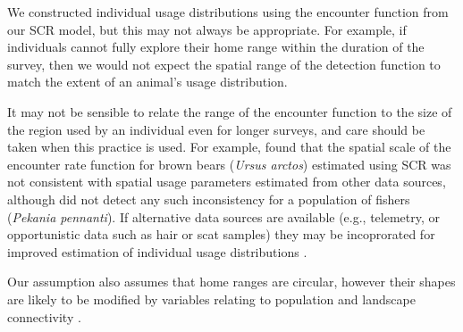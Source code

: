 \documentclass[10pt,a4paper]{article}\usepackage[]{graphicx}\usepackage[]{color}
\begin{document}

We constructed individual usage distributions using the encounter
function from our SCR model, but this may not always be
appropriate. For example, if individuals cannot fully explore their
home range within the duration of the survey, then we would not expect
the spatial range of the detection function to match the extent of an
animal's usage distribution.

It may not be sensible to relate the range of the encounter function
to the size of the region used by an individual even for longer
surveys, and care should be taken when this practice is used. For
example, \citet{Tenan+al:17} found that the spatial scale of the
encounter rate function for brown bears (\emph{Ursus arctos})
estimated using SCR was not consistent with spatial usage parameters
estimated from other data sources, although \citet{Popescu+al:14} did
not detect any such inconsistency for a population of fishers
(\emph{Pekania pennanti}). If alternative data sources are available
(e.g., telemetry, or opportunistic data such as hair or scat samples)
they may be incoprorated for improved estimation of individual usage
distributions \citep{Tenan+al:17}.

Our assumption also assumes that home ranges are circular, however
their shapes are likely to be modified by variables relating to
population and landscape connectivity \citep[see][for a
  review]{Drake+al:ip}.


 
\end{document}
